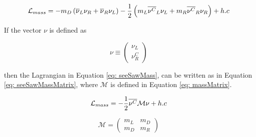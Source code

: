 \begin{equation}\label{eq: seeSawMass}
\mathcal{L}_{mass} = -m_{D}\left(\overline{\nu}_{L}\nu_{R} + \overline{\nu}_{R}\nu_{L}\right) - \frac{1}{2}\left(m_{L}\overline{\nu^{C}}_{L}\nu_{L} + m_{R}\overline{\nu^{C}}_{R}\nu_{R}\right) + h.c
\end{equation}

If the vector $\nu$ is defined as

$$ \nu \equiv \begin{pmatrix} \nu_{L}\\ \nu^{C}_{R} \end{pmatrix}$$

then the Lagrangian in Equation \ref{eq: seeSawMass}, can be written as in Equation \ref{eq: seeSawMassMatrix}, where $\mathcal{M}$ is defined in Equation \ref{eq: massMatrix}.

\begin{equation}\label{eq: seeSawMassMatrix}
\mathcal{L}_{mass} = -\frac{1}{2}\overline{\nu^{C}}\mathcal{M}\nu + h.c
\end{equation}

\begin{equation}\label{eq: massMatrix}
\mathcal{M} = \begin{pmatrix} m_{L}&m_{D}\\m_{D}&m_{R} \end{pmatrix}
\end{equation}








 


